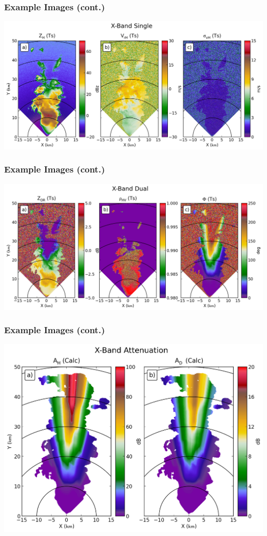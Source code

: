 \documentclass[red]{beamer}
\begin{document}
\begin{frame}
	\frametitle{Example Images (cont.)}
	\includegraphics[scale=0.4]{figures/X_Single.png}
\end{frame}

\begin{frame}
	\frametitle{Example Images (cont.)}
	\includegraphics[scale=0.4]{figures/X_Dual.png}
\end{frame}

\begin{frame}
	\frametitle{Example Images (cont.)}
	\begin{center}
		\includegraphics[scale=0.4]{figures/X_Attenuation.png}
	\end{center}
\end{frame}
\end{document}
